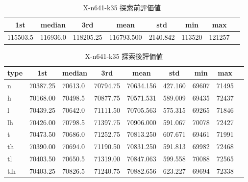 \begin{table}[htbp]
    \caption{X-n641-k35 探索前評価値}
    \begin{tabular}{|l|l|l|l|l|l|l|l|}\hline
    \multicolumn{1}{|c|}{\textbf{1st}}
    &\multicolumn{1}{c|}{\textbf{median}}
    &\multicolumn{1}{c|}{\textbf{3rd}}
    &\multicolumn{1}{c|}{\textbf{mean}}
    &\multicolumn{1}{c|}{\textbf{std}}
    &\multicolumn{1}{c|}{\textbf{min}}
    &\multicolumn{1}{c|}{\textbf{max}}\\\hline
	115503.5 & 116936.0 & 118205.25 & 116793.500 & 2140.842 & 113520 & 121257\\\hline
	\end{tabular}
\end{table}
\begin{table}[htbp]
    \caption{X-n641-k35 探索後評価値}
    \begin{tabular}{|l|l|l|l|l|l|l|l|l|}\hline
    \multicolumn{1}{|c|}{\textbf{type}}
    &\multicolumn{1}{|c|}{\textbf{1st}}
    &\multicolumn{1}{c|}{\textbf{median}}
    &\multicolumn{1}{c|}{\textbf{3rd}}
    &\multicolumn{1}{c|}{\textbf{mean}}
    &\multicolumn{1}{c|}{\textbf{std}}
    &\multicolumn{1}{c|}{\textbf{min}}
    &\multicolumn{1}{c|}{\textbf{max}}\\\hline
	n & 70387.25 & 70613.0 & 70794.75 & 70634.156 & 427.160 & 69607 & 71495\\\hline
	h & 70168.00 & 70498.5 & 70877.75 & 70571.531 & 589.009 & 69435 & 72437\\\hline
	l & 70439.25 & 70642.0 & 71111.50 & 70705.563 & 575.315 & 69265 & 71846\\\hline
	lh & 70426.00 & 70798.5 & 71397.75 & 70906.000 & 591.067 & 70078 & 72427\\\hline
	t & 70473.50 & 70686.0 & 71252.75 & 70813.250 & 607.671 & 69461 & 71991\\\hline
	th & 70390.00 & 70694.0 & 71190.50 & 70831.250 & 591.813 & 69982 & 72468\\\hline
	tl & 70403.50 & 70650.5 & 71319.00 & 70847.063 & 599.558 & 70088 & 72565\\\hline
	tlh & 70403.25 & 70826.5 & 71240.75 & 70882.656 & 623.227 & 69694 & 72338\\\hline
	\end{tabular}
\end{table}
